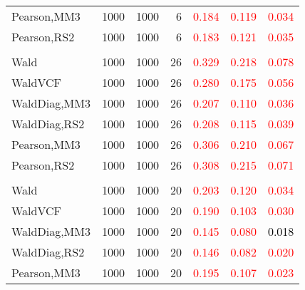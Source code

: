 \documentclass[
]{article}
\begin{document}
\begin{table}[H]
{\begin{tabular}[t]{lrrrrrr}
\hspace{1em}Pearson,MM3 & 1000 & 1000 & 6 & \textcolor{red}{0.184} & \textcolor{red}{0.119} & \textcolor{red}{0.034}\\
\hspace{1em}Pearson,RS2 & 1000 & 1000 & 6 & \textcolor{red}{0.183} & \textcolor{red}{0.121} & \textcolor{red}{0.035}\\
\addlinespace[0.3em]
\multicolumn{7}{l}{\textbf{1F 15V}}\\
\hspace{1em}Wald & 1000 & 1000 & 26 & \textcolor{red}{0.329} & \textcolor{red}{0.218} & \textcolor{red}{0.078}\\
\hspace{1em}WaldVCF & 1000 & 1000 & 26 & \textcolor{red}{0.280} & \textcolor{red}{0.175} & \textcolor{red}{0.056}\\
\hspace{1em}WaldDiag,MM3 & 1000 & 1000 & 26 & \textcolor{red}{0.207} & \textcolor{red}{0.110} & \textcolor{red}{0.036}\\
\hspace{1em}WaldDiag,RS2 & 1000 & 1000 & 26 & \textcolor{red}{0.208} & \textcolor{red}{0.115} & \textcolor{red}{0.039}\\
\hspace{1em}Pearson,MM3 & 1000 & 1000 & 26 & \textcolor{red}{0.306} & \textcolor{red}{0.210} & \textcolor{red}{0.067}\\
\hspace{1em}Pearson,RS2 & 1000 & 1000 & 26 & \textcolor{red}{0.308} & \textcolor{red}{0.215} & \textcolor{red}{0.071}\\
\addlinespace[0.3em]
\multicolumn{7}{l}{\textbf{2F 10V}}\\
\hspace{1em}Wald & 1000 & 1000 & 20 & \textcolor{red}{0.203} & \textcolor{red}{0.120} & \textcolor{red}{0.034}\\
\hspace{1em}WaldVCF & 1000 & 1000 & 20 & \textcolor{red}{0.190} & \textcolor{red}{0.103} & \textcolor{red}{0.030}\\
\hspace{1em}WaldDiag,MM3 & 1000 & 1000 & 20 & \textcolor{red}{0.145} & \textcolor{red}{0.080} & \textcolor{black}{0.018}\\
\hspace{1em}WaldDiag,RS2 & 1000 & 1000 & 20 & \textcolor{red}{0.146} & \textcolor{red}{0.082} & \textcolor{red}{0.020}\\
\hspace{1em}Pearson,MM3 & 1000 & 1000 & 20 & \textcolor{red}{0.195} & \textcolor{red}{0.107} & \textcolor{red}{0.023}\\

\end{tabular}}
\end{table}
\end{document}
